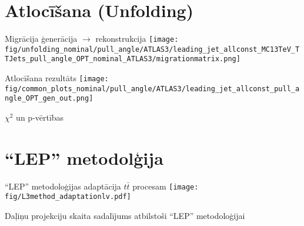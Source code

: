 \documentclass{beamer}
\begin{document}
\section{Atlocīšana (Unfolding)}

\begin{frame}{Migrācija ģenerācija $\rightarrow$ rekonstrukcija}
  \centering
  \texttt{[image: fig/unfolding\_nominal/pull\_angle/ATLAS3/leading\_jet\_allconst\_MC13TeV\_TTJets\_pull\_angle\_OPT\_nominal\_ATLAS3/migrationmatrix.png]}
\end{frame}

\begin{frame}{Atlocīšana rezultāts}
  \centering
  \texttt{[image: fig/common\_plots\_nominal/pull\_angle/ATLAS3/leading\_jet\_allconst\_pull\_angle\_OPT\_gen\_out.png]}
\end{frame}

\begin{frame}{$\chi^{2}$ un p-vērtības}
  \def\customwidth{0.8\textwidth}
  \centering
  
\end{frame}


\section{``LEP'' metodolģija}

\begin{frame}{``LEP'' metodoloģijas adaptācija $t\bar{t}$ procesam} 
  \centering
  \texttt{[image: fig/L3method\_adaptationlv.pdf]}
\end{frame}

\begin{frame}{Daļiņu projekciju skaita sadalījums atbilstoši ``LEP'' metodoloģijai} 
  \centering
  \def\twidth{0.28}
  \setcounter{subfigure}{0}
  \begin{figure}
    \\
  \end{figure}
\end{frame}
\end{document}
